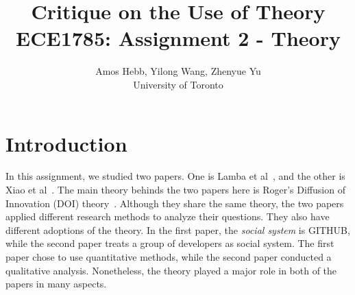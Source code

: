 \documentclass[journal,12pt,onecolumn,]{IEEEtran}
\begin{document}
\title{Critique on the Use of Theory\\
{\normalsize ECE1785: Assignment 2 - Theory}}

\author{Amos Hebb, Yilong Wang, Zhenyue Yu\\ \small University of Toronto}

\maketitle






\section{Introduction}
In this assignment, we studied two papers. One is Lamba et al~\cite{lamba2020heard}, and the other is Xiao et al~\cite{xiao2014social}. The main theory behinds the two papers here is Roger's Diffusion of Innovation (DOI) theory~\cite{rogers1995attributes}. 
Although they share the same theory, the two papers applied different research methods to analyze their questions. They also have different adoptions of the theory. In the first paper, the \textit{social system} is GITHUB, while the second paper treats a group of developers as social system.
The first paper chose to use quantitative methods, while the second paper conducted a qualitative analysis. Nonetheless, the theory played a major role in both of the papers in many aspects.

\end{document}
